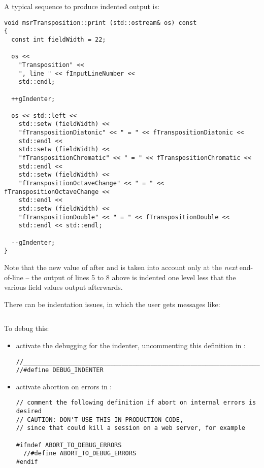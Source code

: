A typical sequence to produce indented output is:
\begin{lstlisting}[language=CPlusPlus]
void msrTransposition::print (std::ostream& os) const
{
  const int fieldWidth = 22;

  os <<
    "Transposition" <<
    ", line " << fInputLineNumber <<
    std::endl;

  ++gIndenter;

  os << std::left <<
    std::setw (fieldWidth) <<
    "fTranspositionDiatonic" << " = " << fTranspositionDiatonic <<
    std::endl <<
    std::setw (fieldWidth) <<
    "fTranspositionChromatic" << " = " << fTranspositionChromatic <<
    std::endl <<
    std::setw (fieldWidth) <<
    "fTranspositionOctaveChange" << " = " << fTranspositionOctaveChange <<
    std::endl <<
    std::setw (fieldWidth) <<
    "fTranspositionDouble" << " = " << fTranspositionDouble <<
    std::endl << std::endl;

  --gIndenter;
}
\end{lstlisting}

Note that the new value of  after  and  is taken into account only at the {\it next} end-of-line -- the output of lines 5 to 8 above is indented one level less that the various field values output afterwards.

There can be indentation issues, in which the user gets messages like:
\begin{lstlisting}[language=Terminal]
% ### Indentation has become negative: -1
\end{lstlisting}

To debug this:
\begin{itemize}
\item activate the debugging for the indenter, uncommenting this definition in :
\begin{lstlisting}[language=CPlusplus]
//______________________________________________________________________________
//#define DEBUG_INDENTER
\end{lstlisting}

\item activate abortion on errors in :
\begin{lstlisting}[language=CPlusPlus]
// comment the following definition if abort on internal errors is desired
// CAUTION: DON'T USE THIS IN PRODUCTION CODE,
// since that could kill a session on a web server, for example

#ifndef ABORT_TO_DEBUG_ERRORS
  //#define ABORT_TO_DEBUG_ERRORS
#endif
\end{lstlisting}


\end{itemize}


